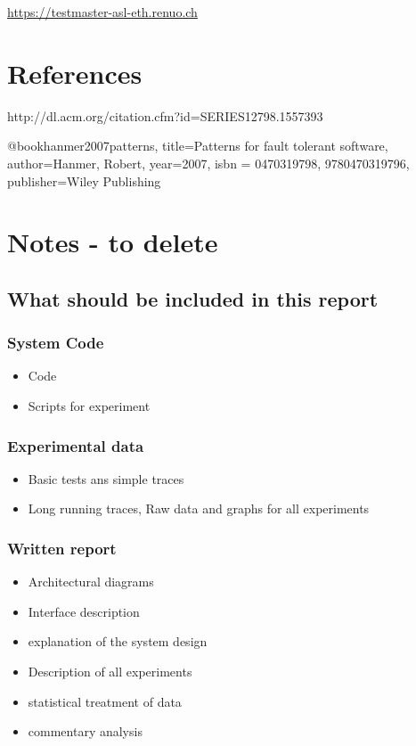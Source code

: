 \documentclass[a4paper]{article}
\begin{document}
\url{https://testmaster-asl-eth.renuo.ch}


\section{References}


http://dl.acm.org/citation.cfm?id=SERIES12798.1557393

@book{hanmer2007patterns,
  title={Patterns for fault tolerant software},
  author={Hanmer, Robert},
  year={2007},
  isbn = {0470319798, 9780470319796},
  publisher={Wiley Publishing}
}

%

\section{Notes - to delete}


\subsection{What should be included in this report }

\subsubsection{System Code}
\begin{itemize}
\item Code
\item Scripts for experiment
\end{itemize}

\subsubsection{Experimental data}
\begin{itemize}
\item Basic tests ans simple traces
\item Long running traces, Raw data and graphs for all experiments
\end{itemize}

\subsubsection{Written report}
\begin{itemize}
\item Architectural  diagrams
\item Interface description
\item explanation of the system design
\item Description of all experiments
\item statistical treatment of data
\item commentary analysis
\end{itemize}
\end{document}
